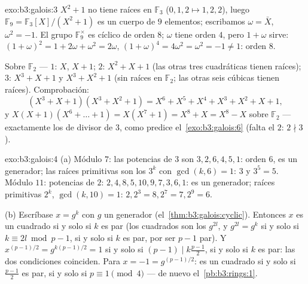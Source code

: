 \begin{solution}{exo:b3:galois:3}
$X^2 + 1$ no tiene raíces en $\mathbb F_3$ ($0, 1, 2 \mapsto 1, 2,
2$), luego $\mathbb F_9 = \mathbb F_3[X]/(X^2+1)$ es un cuerpo de $9$
elementos; escribamos $\omega = \bar X$, $\omega^2 = -1$. El grupo
$\mathbb F_9^\times$ es cíclico de orden $8$; $\omega$ tiene orden $4$,
pero $1 + \omega$ sirve: $(1+\omega)^2 = 1 + 2\omega +
\omega^2 = 2\omega$, $(1+\omega)^4 = 4\omega^2 = \omega^2 = -1
\ne 1$: orden $8$.

Sobre $\mathbb F_2$ ---  $1$:
$X$, $X + 1$;  $2$: $X^2 + X + 1$
(las otras tres cuadráticas tienen raíces);
 $3$: $X^3 + X + 1$ y
$X^3 + X^2 + 1$ (sin raíces en $\mathbb
F_2$; las otras seis cúbicas tienen raíces). Comprobación:
\[
(X^3{+}X{+}1)(X^3{+}X^2{+}1) = X^6 + X^5 + X^4 + X^3 + X^2 + X
+ 1,
\]
y $X(X{+}1)(X^6 + \dots + 1) = X(X^7 + 1) = X^8 + X = X^8 -
X$ sobre $\mathbb F_2$ --- exactamente los
 de
 divisor de $3$, como predice
el~\cref{exo:b3:galois:6} (falta el
 $2$: $2 \nmid 3$).
\end{solution}

\begin{solution}{exo:b3:galois:4}
(a) Módulo $7$: las potencias de $3$ son $3, 2, 6, 4, 5, 1$: orden $6$,
es un generador; las raíces primitivas son los $3^k$ con
$\gcd(k, 6) = 1$: $3$ y $3^5 = 5$. Módulo $11$: potencias de $2$:
$2, 4, 8, 5, 10, 9, 7, 3, 6, 1$: es un generador; raíces primitivas
$2^k$, $\gcd(k, 10) = 1$: $2, 2^3 = 8, 2^7 = 7, 2^9 = 6$.

(b) Escríbase $x = g^k$ con $g$ un generador
(el~\cref{thm:b3:galois:cyclic}). Entonces $x$ es un cuadrado si y solo
si $k$ es par (los cuadrados son los $g^{2l}$, y $g^{2l} = g^{k}$ si y
solo si $k
\equiv 2l \bmod p-1$,  si y
solo si $k$ es par, por ser $p - 1$ par). Y
$x^{(p-1)/2} = g^{k(p-1)/2} = 1$ si y solo si $(p-1) \mid
k\frac{p-1}2$, si y solo si $k$ es par: las dos condiciones coinciden.
Para $x =
-1 = g^{(p-1)/2}$: es un cuadrado si y solo si $\frac{p-1}2$ es par, si
y solo si $p \equiv 1 \pmod 4$ --- de nuevo el~\cref{pb:b3:rings:1}.
\end{solution}

